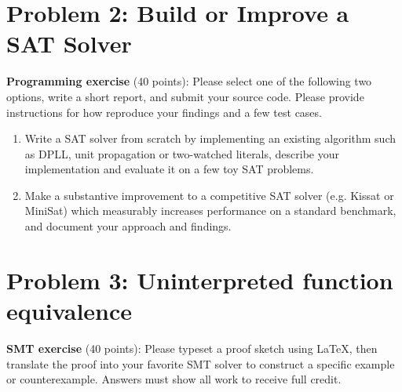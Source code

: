 \documentclass[11pt]{article}
\begin{document}
    \pagebreak


    \section{Problem 2: Build or Improve a SAT Solver}

    \noindent \textbf{Programming exercise} (40 points): Please select one of the following two options, write a short report, and submit your source code. Please provide instructions for how reproduce your findings and a few test cases.

    \begin{enumerate}
        \item Write a SAT solver from scratch by implementing an existing algorithm such as DPLL, unit propagation or two-watched literals, describe your implementation and evaluate it on a few toy SAT problems.
        \item Make a substantive improvement to a competitive SAT solver (e.g. Kissat or MiniSat) which measurably increases performance on a standard benchmark, and document your approach and findings.
    \end{enumerate}

    \section {Problem 3: Uninterpreted function equivalence}

    \noindent \textbf{SMT exercise} (40 points): Please typeset a proof sketch using \LaTeX, then translate the proof into your favorite SMT solver to construct a specific example or counterexample. Answers must show all work to receive full credit.\\
\end{document}
